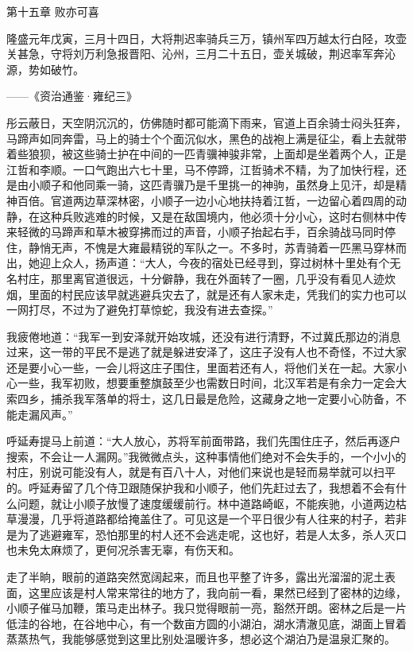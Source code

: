 第十五章    败亦可喜

隆盛元年戊寅，三月十四日，大将荆迟率骑兵三万，镇州军四万越太行白陉，攻壶关甚急，守将刘万利急报晋阳、沁州，三月二十五日，壶关城破，荆迟率军奔沁源，势如破竹。

——《资治通鉴·雍纪三》

彤云蔽日，天空阴沉沉的，仿佛随时都可能滴下雨来，官道上百余骑士闷头狂奔，马蹄声如同奔雷，马上的骑士个个面沉似水，黑色的战袍上满是征尘，看上去就带着些狼狈，被这些骑士护在中间的一匹青骥神骏非常，上面却是坐着两个人，正是江哲和李顺。一口气跑出六七十里，马不停蹄，江哲骑术不精，为了加快行程，还是由小顺子和他同乘一骑，这匹青骥乃是千里挑一的神驹，虽然身上见汗，却是精神百倍。官道两边草深林密，小顺子一边小心地扶持着江哲，一边留心着四周的动静，在这种兵败逃难的时候，又是在敌国境内，他必须十分小心，这时右侧林中传来轻微的马蹄声和草木被穿拂而过的声音，小顺子抬起右手，百余骑战马同时停住，静悄无声，不愧是大雍最精锐的军队之一。不多时，苏青骑着一匹黑马穿林而出，她迎上众人，扬声道：“大人，今夜的宿处已经寻到，穿过树林十里处有个无名村庄，那里离官道很远，十分僻静，我在外面转了一圈，几乎没有看见人迹炊烟，里面的村民应该早就逃避兵灾去了，就是还有人家未走，凭我们的实力也可以一网打尽，不过为了避免打草惊蛇，我没有进去查探。”

我疲倦地道：“我军一到安泽就开始攻城，还没有进行清野，不过冀氏那边的消息过来，这一带的平民不是逃了就是躲进安泽了，这庄子没有人也不奇怪，不过大家还是要小心一些，一会儿将这庄子围住，里面若还有人，将他们关在一起。大家小心一些，我军初败，想要重整旗鼓至少也需数日时间，北汉军若是有余力一定会大索四乡，捕杀我军落单的将士，这几日最是危险，这藏身之地一定要小心防备，不能走漏风声。”

呼延寿提马上前道：“大人放心，苏将军前面带路，我们先围住庄子，然后再逐户搜索，不会让一人漏网。”我微微点头，这种事情他们绝对不会失手的，一个小小的村庄，别说可能没有人，就是有百八十人，对他们来说也是轻而易举就可以扫平的。呼延寿留了几个侍卫跟随保护我和小顺子，他们先赶过去了，我想着不会有什么问题，就让小顺子放慢了速度缓缓前行。林中道路崎岖，不能疾驰，小道两边枯草漫漫，几乎将道路都给掩盖住了。可见这是一个平日很少有人往来的村子，若非是为了逃避雍军，恐怕那里的村人还不会逃走呢，这也好，若是人太多，杀人灭口也未免太麻烦了，更何况杀害无辜，有伤天和。

走了半晌，眼前的道路突然宽阔起来，而且也平整了许多，露出光溜溜的泥土表面，这里应该是村人常来常往的地方了，我向前一看，果然已经到了密林的边缘，小顺子催马加鞭，策马走出林子。我只觉得眼前一亮，豁然开朗。密林之后是一片低洼的谷地，在谷地中心，有一个数亩方圆的小湖泊，湖水清澈见底，湖面上冒着蒸蒸热气，我能够感觉到这里比别处温暖许多，想必这个湖泊乃是温泉汇聚的。

